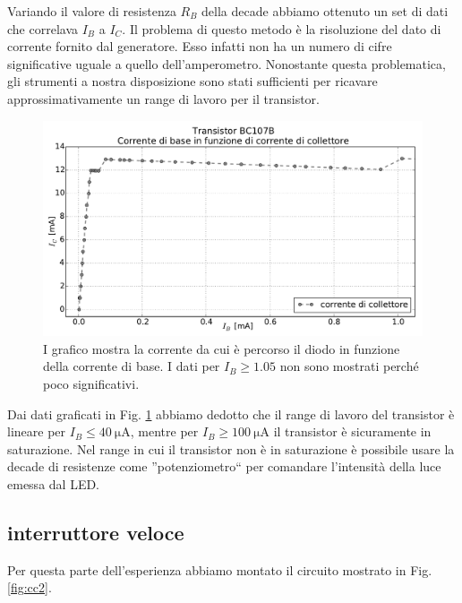 Variando il valore di resistenza $R_B$ della decade abbiamo ottenuto un set di dati che correlava $I_B$ a $I_C$. Il problema di questo metodo è la risoluzione del dato di corrente fornito dal generatore. Esso infatti non ha un numero di cifre significative uguale a quello dell'amperometro. Nonostante questa problematica, gli strumenti a nostra disposizione sono stati sufficienti per ricavare approssimativamente un range di lavoro per il transistor.


\begin{figure}
	\includegraphics[width=120mm]{saturazione_2.pdf}
	\caption{I grafico mostra la corrente da cui è percorso il diodo in funzione della corrente di base. I dati per $I_B \geq 1.05$ non sono mostrati perché poco significativi.}
	\label{fig:saturazione}
\end{figure}

Dai dati graficati in Fig. \ref{fig:saturazione} abbiamo dedotto che il range di lavoro del transistor è lineare per $I_B \leq \SI{40}{\micro\ampere}$, mentre per $I_B \geq \SI{100}{\micro\ampere}$ il transistor è sicuramente in saturazione. Nel range in cui il transistor non è in saturazione è possibile usare la decade di resistenze come ''potenziometro`` per comandare l'intensità della luce emessa dal LED.

\subsection{interruttore veloce}
Per questa parte dell'esperienza abbiamo montato il circuito mostrato in Fig. \ref{fig:cc2}.

